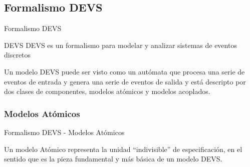 \documentclass[10pt,presentation]{beamer}
\newcommand{\quotes}[1]{``#1''}
\begin{document}
	\subsection{Formalismo DEVS}

\begin{frame}{Formalismo DEVS}
\begin{block}{DEVS}
	DEVS es un formalismo para modelar y analizar sistemas de eventos discretos 
\end{block}
\begin{block}{Un modelo DEVS}
 puede ser visto como un autómata que procesa una serie de eventos de entrada y genera una serie de eventos de salida y está descripto por dos clases de componentes, modelos atómicos y modelos acoplados.
\end{block}
\end{frame}
		\subsubsection{Modelos Atómicos}

\begin{frame}{Formalismo DEVS - Modelos Atómicos}
\begin{block}{Un modelo Atómico} 
	representa la unidad \quotes{indivisible} de especificación, en el sentido que es la pieza fundamental y más básica de un modelo DEVS. 
\end{block}
\end{frame}
\end{document}
